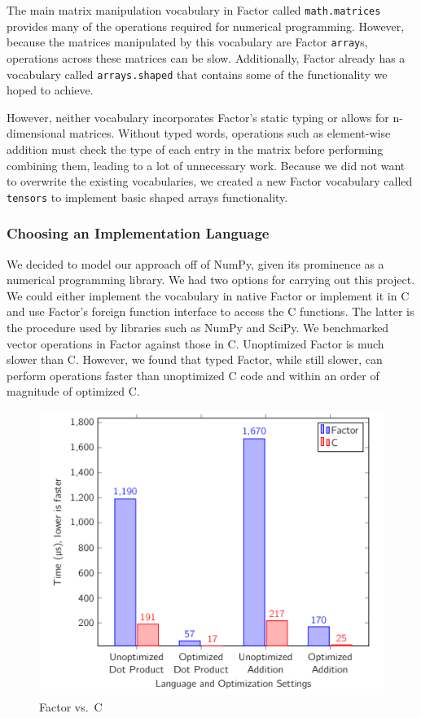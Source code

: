 \documentclass[
]{article}
\begin{document}
The main matrix manipulation vocabulary in Factor called
\texttt{math.matrices} provides many of the operations required for
numerical programming. However, because the matrices manipulated by this
vocabulary are Factor \texttt{array}s, operations across these matrices
can be slow. Additionally, Factor already has a vocabulary called
\texttt{arrays.shaped} that contains some of the functionality we hoped
to achieve.

However, neither vocabulary incorporates Factor's static typing or
allows for n-dimensional matrices. Without typed words, operations such
as element-wise addition must check the type of each entry in the matrix
before performing combining them, leading to a lot of unnecessary work.
Because we did not want to overwrite the existing vocabularies, we
created a new Factor vocabulary called \texttt{tensors} to implement
basic shaped arrays functionality.

\hypertarget{choosing-an-implementation-language}{%
\subsubsection{Choosing an Implementation
Language}\label{choosing-an-implementation-language}}

We decided to model our approach off of NumPy, given its prominence as a
numerical programming library. We had two options for carrying out this
project. We could either implement the vocabulary in native Factor or
implement it in C and use Factor's foreign function interface to access
the C functions. The latter is the procedure used by libraries such as
NumPy and SciPy. We benchmarked vector operations in Factor against
those in C. Unoptimized Factor is much slower than C. However, we found
that typed Factor, while still slower, can perform operations faster
than unoptimized C code and within an order of magnitude of optimized C.

\begin{figure}
\centering
\includegraphics{factor_vs_c.png}
\caption{Factor vs.~C}
\end{figure}
\end{document}
